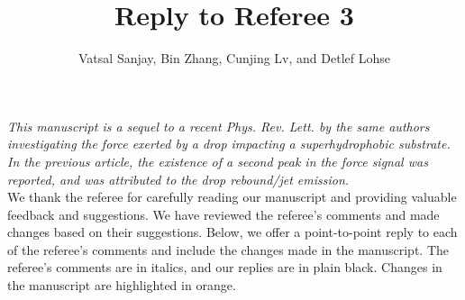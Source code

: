 \documentclass[]{article}
\title{Reply to Referee 3}
\author{Vatsal Sanjay, Bin Zhang, Cunjing Lv, and Detlef Lohse}
\date{}
\begin{document}
	\maketitle
	
\textit{This manuscript is a sequel to a recent Phys. Rev. Lett. by the same authors investigating the force exerted by a drop impacting a superhydrophobic substrate. In the previous article, the existence of a second peak in the force signal was reported, and was attributed to the drop rebound/jet emission.}\\[2mm]
	
We thank the referee for carefully reading our manuscript and providing valuable feedback and suggestions. We have reviewed the referee's comments and made changes based on their suggestions. Below, we offer a point-to-point reply to each of the referee's comments and include the changes made in the manuscript. The referee's comments are in italics, and our replies are in plain black. Changes in the manuscript are highlighted in orange.
	
\end{document}
